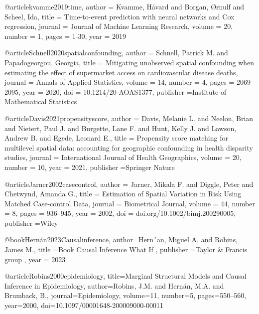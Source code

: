 @article{kvamme2019time,
  author = {Kvamme, Håvard and Borgan, Ørnulf and Scheel, Ida},
  title = {Time-to-event prediction with neural networks and Cox regression},
  journal = {Journal of Machine Learning Research},
  volume = {20},
  number = {1},
  pages = {1-30},
  year = {2019}
}





@article{Schnell2020spatialconfounding,
  author = {Schnell, Patrick M. and Papadogeorgou,  Georgia},
  title = {Mitigating unobserved spatial confounding when estimating the effect of supermarket access on cardiovascular disease deaths},
  journal = {Annals of Applied Statistics},
  volume = {14},
  number = {4},
  pages = {2069--2095},
  year = {2020},
  doi = {10.1214/20-AOAS1377},
  publisher ={Institute of Mathematical Statistics}
}





@article{Davis2021propensityscore,
  author = {Davis, Melanie L. and Neelon, Brian and Nietert, Paul J. and Burgette, Lane F. and Hunt, Kelly J. and Lawson, Andrew B. and Egede, Leonard E.},
  title = {Propensity score matching for multilevel spatial data: accounting for geographic confounding in health disparity studies},
  journal = {International Journal of Health Geographics},
  volume = {20},
  number = {10},
  year = {2021},
  publisher ={Springer Nature}
}






@article{Jarner2002casecontrol,
  author = {Jarner, Mikala F. and Diggle, Peter and Chetwynd, Amanda G.},
  title = {Estimation of Spatial Variation in Risk Using Matched Case-control Data},
  journal = {Biometrical Journal},
  volume = {44},
  number = {8},
  pages = {936--945},
  year = {2002},
  doi = {doi.org/10.1002/bimj.200290005},
  publisher ={Wiley}
}





@book{Hernán2023Causalinference,
    author={Hern´an, Miguel A. and Robins, James M.},
    title ={Book Causal Inference What If} ,
    publisher ={Taylor & Francis group} ,
    year = {2023}
}





@article{Robins2000epidemiology,
  title={Marginal Structural Models and Causal Inference in Epidemiology},
  author={Robins, J.M. and Hernán, M.A. and Brumback, B.},
  journal={Epidemiology},
  volume={11},
  number={5},
  pages={550--560},
  year={2000},
  doi={10.1097/00001648-200009000-00011}
}





